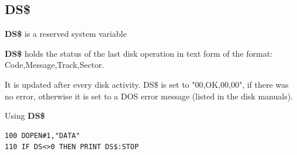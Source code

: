 \newpage
\subsection{DS\$}
\begin{description}[leftmargin=2cm,style=nextline]
\item [Format:] {\bf DS\$} is a reserved system variable
\item [Usage:]  {\bf DS\$} holds the status of the last disk operation
                in text form of the format:
                Code,Message,Track,Sector.

                It is updated after every disk activity.
                DS\$ is set to "00,OK,00,00", if there was no error, otherwise
                it is set to a DOS error message (listed in the
                disk manuals).

\item [Example:] Using {\bf DS\$}
\begin{tcolorbox}[colback=black,coltext=white]
\verbatimfont{\codefont}
\begin{verbatim}
100 DOPEN#1,"DATA"
110 IF DS<>0 THEN PRINT DS$:STOP
\end{verbatim}
\end{tcolorbox}
\end{description}


\newpage

